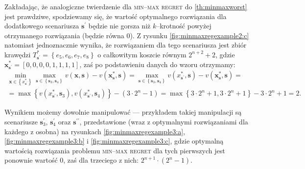 Zakładając, że analogiczne twierdzenie dla \textsc{min--max regret} do \ref{th:minmaxworst} jest prawdziwe, spodziewamy się, że wartość optymalnego rozwiązania dla dodatkowego scenariusza $\textbf{s}^{\prime}$ będzie nie gorsza niż $k$--krotność powyżej otrzymanego rozwiązania (będzie równa $0$). Z rysunku \ref{fig:minmaxregexample2:c} natomiast jednoznacznie wynika, że rozwiązaniem dla tego scenariusza jest zbiór krawędzi $T^{\ast}_{\textbf{s}^{\prime}} = \left\{ e_{5}, e_{6}, e_{7}, e_{8} \right\}$ o całkowitym koszcie równym $2^{n+2} + 2$, gdzie $\textbf{x}^{\ast}_{\textbf{s}^{\prime}} = \left[ 0, 0, 0, 0, 1, 1, 1, 1 \right]$, zaś po podstawieniu danych do wzoru otrzymamy:
\begin{gather*}
	\min_{\textbf{x} \in \left\{ x^{\ast}_{\textbf{s}^{\prime}} \right\}} \max_{\textbf{s} \in \left\{ \textbf{s}_{3}, \textbf{s}_{4} \right\}} v \left( \textbf{x}, \textbf{s} \right) - v \left( \textbf{x}^{\ast}_{\textbf{s}}, \textbf{s} \right) = \max_{\textbf{s} \in \left\{ \textbf{s}_{3}, \textbf{s}_{4} \right\}} v \left( x^{\ast}_{\textbf{s}^{\prime}}, \textbf{s} \right) - v \left( \textbf{x}^{\ast}_{\textbf{s}}, \textbf{s} \right) = \\ = \max \left\{ v \left( x^{\ast}_{\textbf{s}^{\prime}}, \textbf{s}_{3} \right), v \left( x^{\ast}_{\textbf{s}^{\prime}}, \textbf{s}_{4} \right) \right\} - \left( 3 \cdot 2^{n} - 1 \right) = \max \left\{ 3 \cdot 2^{n} + 1, 3 \cdot 2^{n} + 1 \right\} - 3 \cdot 2^{n} + 1 = 2\text{.}
\end{gather*}

Wynikiem możemy dowolnie manipulować --- przykładem takiej manipulacji są scenariusze $\textbf{s}^{\prime}_{3}$, $\textbf{s}^{\prime}_{4}$ oraz $\textbf{s}^{\prime\prime}$, przedstawione (wraz z optymalnymi rozwiązaniami dla każdego z osobna) na rysunkach \ref{fig:minmaxregexample3:a}, \ref{fig:minmaxregexample3:b} i \ref{fig:minmaxregexample3:c}, gdzie optymalną wartością rozwiązania problemu \textsc{min--max regret} dla tych pierwszych jest ponownie wartość $0$, zaś dla trzeciego z nich: $2^{n+1} \cdot \left( 2^{n} - 1\right)$.


